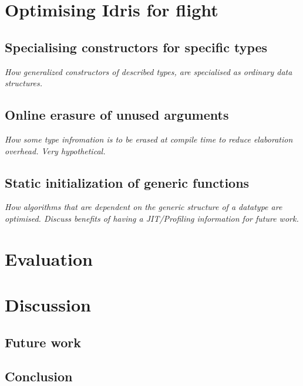 \documentclass{ituthesis}
\theoremstyle{definition}
\begin{document}
\chapter{Optimising Idris for flight}
\label{cha:OptimizingIdrisforFlight}

\section{Specialising constructors for specific types}
\label{sec:SpecialisingConstructorsforSpecificTypes}
\textit{How generalized constructors of described types, are specialised as ordinary data structures.}

\section{Online erasure of unused arguments}
\label{sec:OnlineErasureofUnusedArguments}
\textit{How some type infromation is to be erased at compile time to reduce elaboration overhead. Very hypothetical.}

\section{Static initialization of generic functions}
\label{sec:StaticInitializationofGenericFunctions}
\textit{How algorithms that are dependent on the generic structure of a datatype are optimised. Discuss benefits of having a JIT/Profiling information for future work.}

\chapter{Evaluation}
\label{cha:Evaluation}

\chapter{Discussion}
\label{cha:Discussion}

\section{Future work}
\label{sec:FutureWork}

\section{Conclusion}
\label{sec:Conclusion}

\appendix

\end{document}
